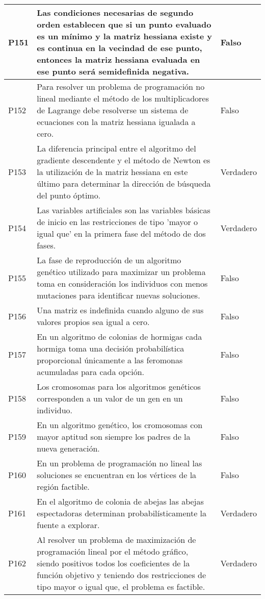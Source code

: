 \documentclass{article}
\begin{document}
\begin{longtable}{|p{1.5cm}|p{14cm}|p{2cm}|}
P151 & Las condiciones necesarias de segundo orden establecen que si un punto evaluado es un mínimo y la matriz hessiana existe y es continua en la vecindad de ese punto, entonces la matriz hessiana evaluada en ese punto será semidefinida negativa. & Falso \\ \hline
P152 & Para resolver un problema de programación no lineal mediante el método de los multiplicadores de Lagrange debe resolverse un sistema de ecuaciones con la matriz hessiana igualada a cero. & Falso \\ \hline
P153 & La diferencia principal entre el algoritmo del gradiente descendente y el método de Newton es la utilización de la matriz hessiana en este último para determinar la dirección de búsqueda del punto óptimo. & Verdadero \\ \hline
P154 & Las variables artificiales son las variables básicas de inicio en las restricciones de tipo 'mayor o igual que' en la primera fase del método de dos fases. & Verdadero \\ \hline
P155 & La fase de reproducción de un algoritmo genético utilizado para maximizar un problema toma en consideración los individuos con menos mutaciones para identificar nuevas soluciones. & Falso \\ \hline
P156 & Una matriz es indefinida cuando alguno de sus valores propios sea igual a cero. & Falso \\ \hline
P157 & En un algoritmo de colonias de hormigas cada hormiga toma una decisión probabilística proporcional únicamente a las feromonas acumuladas para cada opción. & Falso \\ \hline
P158 & Los cromosomas para los algoritmos genéticos corresponden a un valor de un gen en un individuo. & Falso \\ \hline
P159 & En un algoritmo genético, los cromosomas con mayor aptitud son siempre los padres de la nueva generación. & Falso \\ \hline
P160 & En un problema de programación no lineal las soluciones se encuentran en los vértices de la región factible. & Falso \\ \hline
P161 & En el algoritmo de colonia de abejas las abejas espectadoras determinan probabilísticamente la fuente a explorar. & Verdadero \\ \hline
P162 & Al resolver un problema de maximización de programación lineal por el método gráfico, siendo positivos todos los coeficientes de la función objetivo y teniendo dos restricciones de tipo mayor o igual que, el problema es factible. & Verdadero \\ \hline

\end{longtable}
\end{document}
